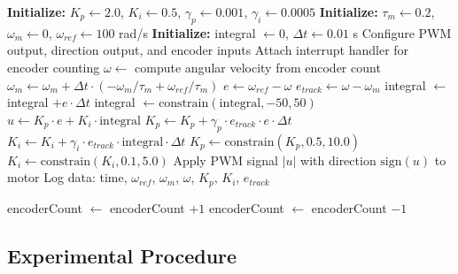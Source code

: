 \begin{algorithm}
\caption{Adaptive Motor Speed Control with MIT Rule}
\begin{algorithmic}[1]
\State \textbf{Initialize:} $K_p \gets 2.0$, $K_i \gets 0.5$, $\gamma_p \gets 0.001$, $\gamma_i \gets 0.0005$
\State \textbf{Initialize:} $\tau_m \gets 0.2$, $\omega_m \gets 0$, $\omega_{ref} \gets 100$ rad/s
\State \textbf{Initialize:} integral $\gets 0$, $\Delta t \gets 0.01$ s
\State Configure PWM output, direction output, and encoder inputs
\State Attach interrupt handler for encoder counting
        \State $\omega \gets$ compute angular velocity from encoder count
        \State $\omega_m \gets \omega_m + \Delta t \cdot (-\omega_m/\tau_m + \omega_{ref}/\tau_m)$ 
        \State $e \gets \omega_{ref} - \omega$ 
        \State $e_{track} \gets \omega - \omega_m$ 
        \State integral $\gets$ integral $+ e \cdot \Delta t$
        \State integral $\gets \text{constrain}(\text{integral}, -50, 50)$ 
        \State $u \gets K_p \cdot e + K_i \cdot \text{integral}$ 
        \State $K_p \gets K_p + \gamma_p \cdot e_{track} \cdot e \cdot \Delta t$ 
        \State $K_i \gets K_i + \gamma_i \cdot e_{track} \cdot \text{integral} \cdot \Delta t$ 
        \State $K_p \gets \text{constrain}(K_p, 0.5, 10.0)$ 
        \State $K_i \gets \text{constrain}(K_i, 0.1, 5.0)$
        \State Apply PWM signal $|u|$ with direction $\text{sign}(u)$ to motor
        \State Log data: time, $\omega_{ref}$, $\omega_m$, $\omega$, $K_p$, $K_i$, $e_{track}$
    \EndIf
\EndWhile
\end{algorithmic}
\end{algorithm}

\begin{algorithm}
\caption{Encoder Interrupt Service Routine}
\begin{algorithmic}[1]
    \State encoderCount $\gets$ encoderCount $+ 1$
\Else
    \State encoderCount $\gets$ encoderCount $- 1$
\EndIf
\end{algorithmic}
\end{algorithm}

\subsection{Experimental Procedure}

